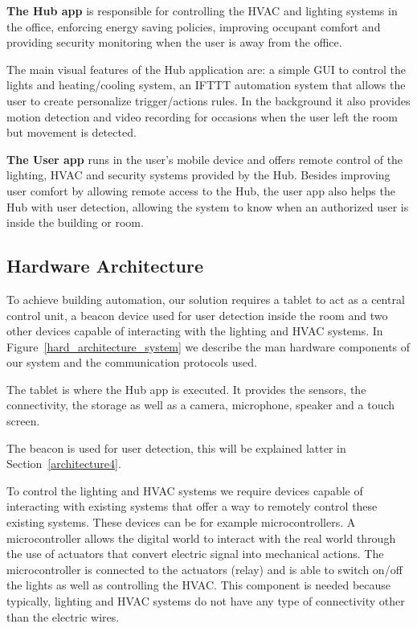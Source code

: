 \documentclass[conference]{IEEEtran}
\begin{document}
\textbf{The Hub app} is responsible for controlling the \ac{HVAC} and lighting systems in the office, enforcing energy saving policies, improving occupant comfort and providing security monitoring when the user is away from the office.

The main visual features of the Hub application are: a simple \ac{GUI} to control the lights and heating/cooling system, an \ac{IFTTT} automation system that allows the user to create personalize trigger/actions rules. In the background it also provides motion detection and video recording for occasions when the user left the room but movement is detected.

\textbf{The User app} runs in the user's mobile device and offers remote control of the lighting, \ac{HVAC} and security systems provided by the Hub. Besides improving user comfort by allowing remote access to the Hub, the user app also helps the Hub with user detection, allowing the system to know when an authorized user is inside the building or room.

\subsection{Hardware Architecture}

To achieve building automation, our solution requires a tablet to act as a central control unit, a beacon device used for user detection inside the room and two other devices capable of interacting with the lighting and \ac{HVAC} systems. In Figure~\ref{hard_architecture_system} we describe the man hardware components of our system and the communication protocols used.

The tablet is where the Hub app is executed. It provides the sensors, the connectivity, the storage as well as a camera, microphone, speaker and a touch screen. 

The beacon is used for user detection, this will be explained latter in Section~\ref{architecture4}.

To control the lighting and \ac{HVAC} systems we require devices capable of interacting with existing systems that offer a way to remotely control these existing systems. These devices can be for example microcontrollers. A microcontroller allows the digital world to interact with the real world through the use of actuators that convert electric signal into mechanical actions. The microcontroller is connected to the actuators (relay) and is able to switch on/off the lights as well as controlling the HVAC. This component is needed because typically, lighting and HVAC systems do not have any type of connectivity other than the electric wires. 
\end{document}
